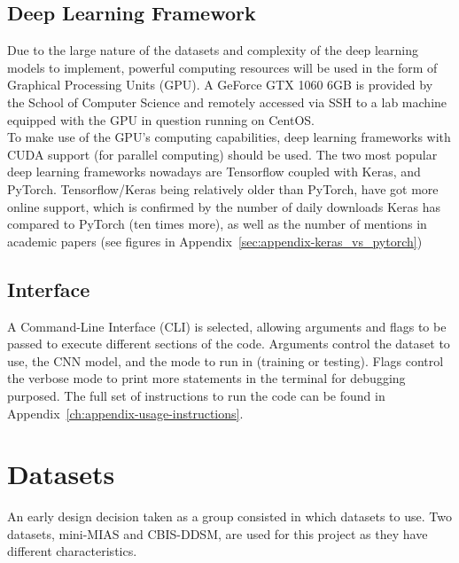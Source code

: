 \subsection{Deep Learning Framework}

Due to the large nature of the datasets and complexity of the deep learning models to implement, powerful computing resources will be used in the form of Graphical Processing Units (GPU). A GeForce GTX 1060 6GB is provided by the School of Computer Science and remotely accessed via SSH to a lab machine equipped with the GPU in question running on CentOS.\\

To make use of the GPU's computing capabilities, deep learning frameworks with CUDA support (for parallel computing) should be used. The two most popular deep learning frameworks nowadays are Tensorflow coupled with Keras, and PyTorch. Tensorflow/Keras being relatively older than PyTorch, have got more online support, which is confirmed by the number of daily downloads Keras has compared to PyTorch (ten times more), as well as the number of mentions in academic papers (see figures  in Appendix~\ref{sec:appendix-keras_vs_pytorch})

\subsection{Interface}

A Command-Line Interface (CLI) is selected, allowing arguments and flags to be passed to execute different sections of the code. Arguments control the dataset to use, the CNN model, and the mode to run in (training or testing). Flags control the verbose mode to print more statements in the terminal for debugging purposed. The full set of instructions to run the code can be found in Appendix~\ref{ch:appendix-usage-instructions}.


\section{Datasets}

An early design decision taken as a group consisted in which datasets to use. Two datasets, mini-MIAS and CBIS-DDSM, are used for this project as they have different characteristics.\\

